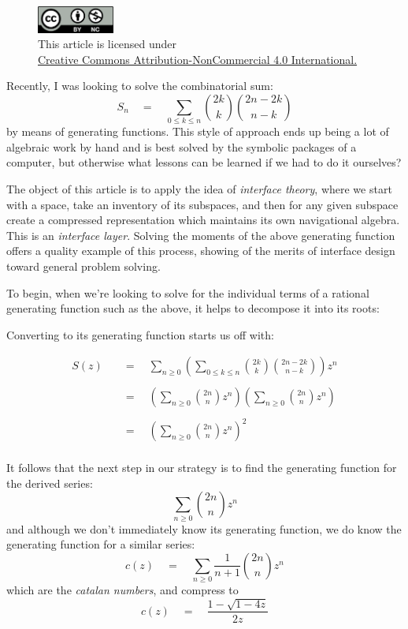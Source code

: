 \documentclass[twoside]{article}
\newcommand{\equals}{\ensuremath{\quad =\quad}}
\newcommand{\cat}{\ensuremath{c}}
\begin{document}
\begin{figure}[h]
\centering
\includegraphics[width=1in]{../../../cc-by-nc.png}\\[0.1in]
\tiny This article is licensed under \\
\href{http://creativecommons.org/licenses/by-nc/4.0/}
{Creative Commons Attribution-NonCommercial 4.0 International.}\\[0.3in]
\end{figure}

Recently, I was looking to solve the combinatorial sum:
$$ S_n \equals \sum_{0\le k\le n}{2k \choose k}{2n-2k \choose n-k} $$
by means of generating functions. This style of approach ends up being a lot of algebraic work by hand and is best solved by
the symbolic packages of a computer, but otherwise what lessons can be learned if we had to do it ourselves?

The object of this article is to apply the idea of \emph{interface theory}, where we start with a space, take an inventory
of its subspaces, and then for any given subspace create a compressed representation which maintains its own navigational algebra.
This is an \emph{interface layer}. Solving the moments of the above generating function offers a quality example of this process,
showing of the merits of interface design toward general problem solving.

To begin, when we're looking to solve for the individual terms of a rational generating function such as the above, it helps to decompose
it into its roots:

Converting to its generating function starts us off with:

\begin{align*}
S(z)		& \equals \sum_{n\ge 0}\left(\sum_{0\le k\le n}{2k \choose k}{2n-2k \choose n-k}\right)z^n		\\
															\\
		& \equals \left(\sum_{n\ge 0}{2n \choose n}z^n\right)\left(\sum_{n\ge 0}{2n \choose n}z^n\right)	\\
															\\
		& \equals \left(\sum_{n\ge 0}{2n \choose n}z^n\right)^2							\\
\end{align*}

It follows that the next step in our strategy is to find the generating function for the derived series:
$$ \sum_{n\ge 0}{2n \choose n}z^n $$
and although we don't immediately know its generating function, we do know the generating function for a similar series:
$$ \cat(z) \equals \sum_{n\ge 0}\frac{1}{n+1}{2n \choose n}z^n $$
which are the \emph{catalan numbers}, and compress to
$$ \cat(z) \equals \frac{1-\sqrt{1-4z}}{2z} $$
\end{document}
